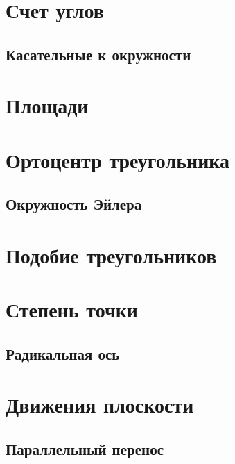 \documentclass[twoside]{article}
\begin{document}
\pagestyle{empty}

\newpage

\tableofcontents
\newpage

\setcounter{page}{1}
\pagestyle{fancy}

\section{Счет углов}

\subsection{Касательные к окружности}

\section{Площади}

\section{Ортоцентр треугольника}



\subsection{Окружность Эйлера}


\section{Подобие треугольников}

\section{Степень точки}


\subsection{Радикальная ось}


\section{Движения плоскости}
\subsection{Параллельный перенос}
\end{document}

